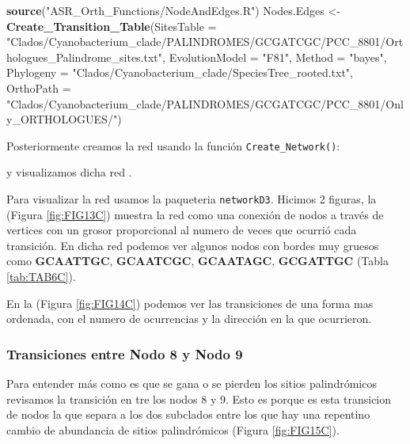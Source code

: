 \documentclass[
]{book}
\newenvironment{Shaded}{\begin{snugshade}}{\end{snugshade}}
\newcommand{\AttributeTok}[1]{\textcolor[rgb]{0.13,0.29,0.53}{#1}}
\newcommand{\FunctionTok}[1]{\textcolor[rgb]{0.13,0.29,0.53}{\textbf{#1}}}
\newcommand{\NormalTok}[1]{#1}
\newcommand{\OtherTok}[1]{\textcolor[rgb]{0.56,0.35,0.01}{#1}}
\newcommand{\StringTok}[1]{\textcolor[rgb]{0.31,0.60,0.02}{#1}}
\begin{document}
\begin{Shaded}
\begin{Highlighting}[]
\FunctionTok{source}\NormalTok{(}\StringTok{"ASR\_Orth\_Functions/NodeAndEdges.R"}\NormalTok{)}
\NormalTok{Nodes.Edges }\OtherTok{\textless{}{-}} \FunctionTok{Create\_Transition\_Table}\NormalTok{(}\AttributeTok{SitesTable =} \StringTok{"Clados/Cyanobacterium\_clade/PALINDROMES/GCGATCGC/PCC\_8801/Orthologues\_Palindrome\_sites.txt"}\NormalTok{,}
                                \AttributeTok{EvolutionModel =} \StringTok{"F81"}\NormalTok{,}
                                \AttributeTok{Method =} \StringTok{"bayes"}\NormalTok{,}
                                \AttributeTok{Phylogeny =} \StringTok{"Clados/Cyanobacterium\_clade/SpeciesTree\_rooted.txt"}\NormalTok{,}
                                \AttributeTok{OrthoPath =} \StringTok{"Clados/Cyanobacterium\_clade/PALINDROMES/GCGATCGC/PCC\_8801/Only\_ORTHOLOGUES/"}\NormalTok{)}
\end{Highlighting}
\end{Shaded}

Posteriormente creamos la red usando la función \texttt{Create\_Network()}:

y visualizamos dicha red .

Para visualizar la red usamos la paqueteria \texttt{networkD3}. Hicimos 2 figuras, la (Figura \ref{fig:FIG13C}) muestra la red como una conexión de nodos a través de vertices con un grosor proporcional al numero de veces que ocurrió cada transición. En dicha red podemos ver algunos nodos con bordes muy gruesos como \textbf{GCAATTGC}, \textbf{GCAATCGC}, \textbf{GCAATAGC}, \textbf{GCGATTGC} (Tabla \ref{tab:TAB6C}).

En la (Figura \ref{fig:FIG14C}) podemos ver las transiciones de una forma mas ordenada, con el numero de ocurrencias y la dirección en la que ocurrieron.

\hypertarget{transiciones-entre-nodo-8-y-nodo-9}{%
\subsubsection{Transiciones entre Nodo 8 y Nodo 9}\label{transiciones-entre-nodo-8-y-nodo-9}}

Para entender más como es que se gana o se pierden los sitios palindrómicos revisamos la transición en tre los nodos 8 y 9. Esto es porque es esta transicion de nodos la que separa a los dos subclados entre los que hay una repentino cambio de abundancia de sitios palindrómicos (Figura \ref{fig:FIG15C}).
\end{document}
